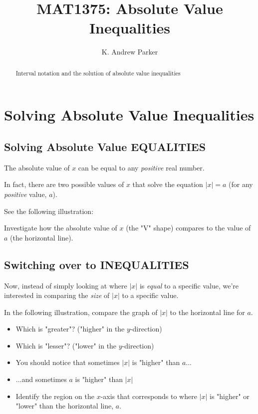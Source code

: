 \documentclass{ximera}
\title{MAT1375: Absolute Value Inequalities}
\author{K. Andrew Parker}
\begin{document}
\begin{abstract}
Interval notation and the solution of absolute value inequalities
\end{abstract}

\maketitle

\section{Solving Absolute Value Inequalities}

\subsection{Solving Absolute Value EQUALITIES}

The absolute value of $x$ can be equal to any \emph{positive} real number.

In fact, there are two possible values of $x$ that solve the equation $|x|=a$ (for any \emph{positive} value, $a$).

See the following illustration:

Investigate how the absolute value of $x$ (the "V" shape) compares to the value of $a$ (the horizontal line).

\begin{center}
\end{center}

\subsection{Switching over to INEQUALITIES}

Now, instead of simply looking at where $|x|$ is \emph{equal} to a specific value, we're interested in comparing the \emph{size} of $|x|$ to a specific value.

In the following illustration, compare the graph of $|x|$ to the horizontal line for $a$.
\begin{itemize}
\item Which is "greater"? ("higher" in the $y$-direction)
\item Which is "lesser"? ("lower" in the $y$-direction)
\item You should notice that sometimes $|x|$ is "higher" than $a$...
\item ...and sometimes $a$ is "higher" than $|x|$
\item Identify the region on the $x$-axis that corresponds to where $|x|$ is "higher" or "lower" than the horizontal line, $a$.
\end{itemize}
\end{document}
